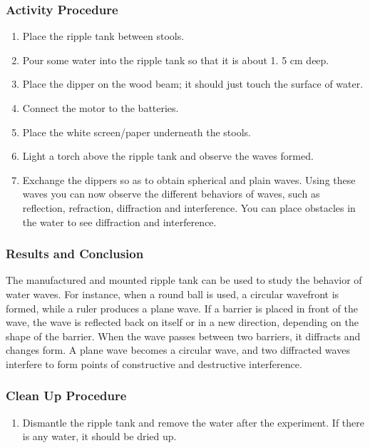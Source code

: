 \subsubsection*{Activity Procedure}
\begin{enumerate}
\item{Place the ripple tank between stools.} 
\item{Pour some water into the ripple tank so that it is about 1.  5 cm deep.} 
\item{Place the dipper on the wood beam; it should just touch the surface of water.} 
\item{Connect the motor to the batteries.} 
\item{Place the white screen/paper underneath the stools.} 
\item{Light a torch above the ripple tank and observe the waves formed.} 
\item{Exchange the dippers so as to obtain spherical and plain waves. Using these waves you can now observe the different behaviors of waves, such as reflection, refraction, diffraction and interference. You can place obstacles in the water to see diffraction and interference.} 
\end{enumerate}

\subsubsection*{Results and Conclusion}
The manufactured and mounted ripple tank can be used to study the behavior of water waves.  For instance, when a round ball is used, a circular wavefront is formed, while a ruler produces a plane wave.  If a barrier is placed in front of the wave, the wave is reflected back on itself or in a new direction, depending on the shape of the barrier.  When the wave passes between two barriers, it diffracts and changes form.  A plane wave becomes a circular wave, and two diffracted waves interfere to form points of constructive and destructive interference.

\subsubsection*{Clean Up Procedure}
\begin{enumerate}
\item{Dismantle the ripple tank and remove the water after the experiment. If there is any water, it should be dried up.} 
\end{enumerate}

